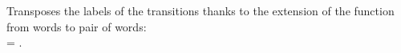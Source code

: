 \thii Transposes 
the labels of the transitions thanks to the extension of the function 
 from words to pair of words:\\
= .


% 
% 
% 
% 
% 
% 
% 
% 
% 
% 
